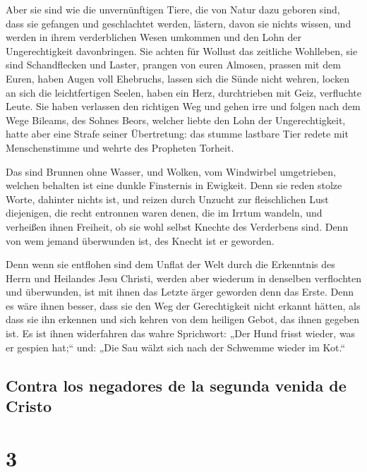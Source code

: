 Aber sie sind wie die unvernünftigen Tiere, die von
Natur dazu geboren sind, dass sie gefangen und geschlachtet werden,
lästern, davon sie nichts wissen, und werden in ihrem verderblichen
Wesen umkommen  und den Lohn der Ungerechtigkeit
davonbringen. Sie achten für Wollust das zeitliche Wohlleben, sie sind
Schandflecken und Laster, prangen von euren Almosen, prassen mit dem
Euren,  haben Augen voll Ehebruchs, lassen sich die Sünde
nicht wehren, locken an sich die leichtfertigen Seelen, haben ein Herz,
durchtrieben mit Geiz, verfluchte Leute.  Sie haben
verlassen den richtigen Weg und gehen irre und folgen nach dem Wege
Bileams, des Sohnes Beors, welcher liebte den Lohn der Ungerechtigkeit,
 hatte aber eine Strafe seiner Übertretung: das stumme
lastbare Tier redete mit Menschenstimme und wehrte des Propheten
Torheit.

 Das sind Brunnen ohne Wasser, und Wolken, vom Windwirbel
umgetrieben, welchen behalten ist eine dunkle Finsternis in Ewigkeit.
 Denn sie reden stolze Worte, dahinter nichts ist, und
reizen durch Unzucht zur fleischlichen Lust diejenigen, die recht
entronnen waren denen, die im Irrtum wandeln,  und
verheißen ihnen Freiheit, ob sie wohl selbst Knechte des Verderbens
sind. Denn von wem jemand überwunden ist, des Knecht ist er geworden.

 Denn wenn sie entflohen sind dem Unflat der Welt durch
die Erkenntnis des Herrn und Heilandes Jesu Christi, werden aber
wiederum in denselben verflochten und überwunden, ist mit ihnen das
Letzte ärger geworden denn das Erste.  Denn es wäre ihnen
besser, dass sie den Weg der Gerechtigkeit nicht erkannt hätten, als
dass sie ihn erkennen und sich kehren von dem heiligen Gebot, das ihnen
gegeben ist.  Es ist ihnen widerfahren das wahre
Sprichwort: „Der Hund frisst wieder, was er gespien hat;`` und: „Die Sau
wälzt sich nach der Schwemme wieder im Kot.``

\hypertarget{contra-los-negadores-de-la-segunda-venida-de-cristo}{%
\subsection{Contra los negadores de la segunda venida de
Cristo}\label{contra-los-negadores-de-la-segunda-venida-de-cristo}}

\hypertarget{section-2}{%
\section{3}\label{section-2}}

